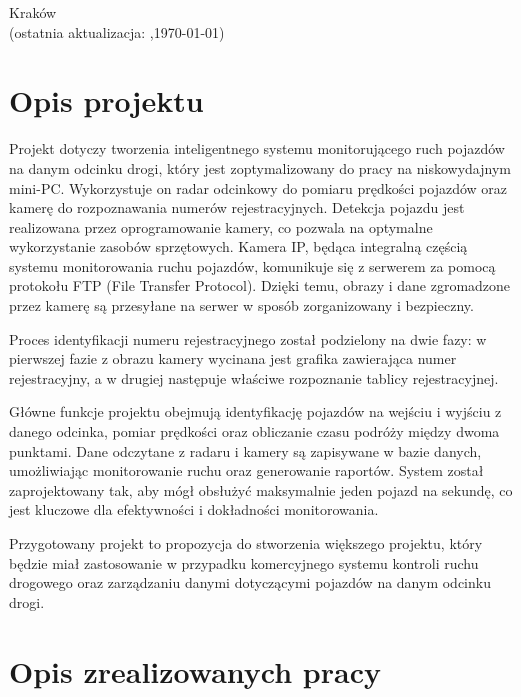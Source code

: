 \documentclass[12pt,a4paper,oneside]{article}
\theoremstyle{definition}
\numberwithin{equation}{section}
\begin{document}
\begin{titlepage}
\vspace*{\fill}
\begin{center}
\large
Kraków \the\year\\
(ostatnia aktualizacja: \DTMcurrenttime,\;\today)
\end{center}
\end{titlepage}
\setcounter{page}{0} 
\newpage\null\thispagestyle{empty}

\tableofcontents


\newpage

\section{Opis projektu}
Projekt dotyczy tworzenia inteligentnego systemu monitorującego ruch pojazdów na danym odcinku drogi, który jest zoptymalizowany do pracy na niskowydajnym mini-PC. Wykorzystuje on radar odcinkowy do pomiaru prędkości pojazdów oraz kamerę do rozpoznawania numerów rejestracyjnych. Detekcja pojazdu jest realizowana przez oprogramowanie kamery, co pozwala na optymalne wykorzystanie zasobów sprzętowych. Kamera IP, będąca integralną częścią systemu monitorowania ruchu pojazdów, komunikuje się z serwerem za pomocą protokołu FTP (File Transfer Protocol). Dzięki temu, obrazy i dane zgromadzone przez kamerę są przesyłane na serwer w sposób zorganizowany i bezpieczny.

Proces identyfikacji numeru rejestracyjnego został podzielony na dwie fazy: w pierwszej fazie z obrazu kamery wycinana jest grafika zawierająca numer rejestracyjny, a w drugiej następuje właściwe rozpoznanie tablicy rejestracyjnej.

Główne funkcje projektu obejmują identyfikację pojazdów na wejściu i wyjściu z danego odcinka, pomiar prędkości oraz obliczanie czasu podróży między dwoma punktami. Dane odczytane z radaru i kamery są zapisywane w bazie danych, umożliwiając monitorowanie ruchu oraz generowanie raportów. System został zaprojektowany tak, aby mógł obsłużyć maksymalnie jeden pojazd na sekundę, co jest kluczowe dla efektywności i dokładności monitorowania.

Przygotowany projekt to propozycja do stworzenia większego projektu, który będzie miał zastosowanie w przypadku komercyjnego systemu kontroli ruchu drogowego oraz zarządzaniu danymi dotyczącymi pojazdów na danym odcinku drogi.

\section{Opis zrealizowanych pracy}
\end{document}

